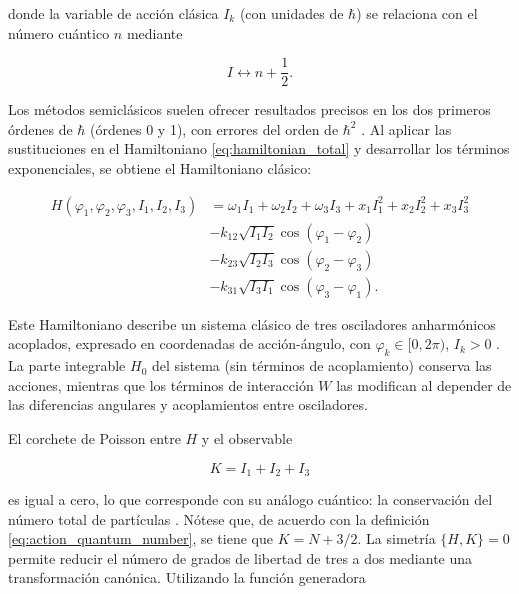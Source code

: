 \noindent donde la variable de acción clásica $ I_k $ (con unidades de $\hbar$) se relaciona con el
número cuántico $n$ mediante

\begin{equation}
    I \leftrightarrow n + \frac{1}{2}.
    \label{eq:action_quantum_number}
\end{equation}

Los métodos semiclásicos suelen ofrecer resultados precisos en los dos primeros órdenes de
$\hbar$ (órdenes 0 y 1), con errores del orden de $\hbar^2$ \cite{mossmann2006semiclassical}.
Al aplicar las sustituciones en el Hamiltoniano \eqref{eq:hamiltonian_total} y desarrollar los
términos exponenciales, se obtiene el Hamiltoniano clásico:

\begin{equation}
    \begin{aligned}
        H(\varphi_1, \varphi_2, \varphi_3, I_1, I_2, I_3) & = \omega_1 I_1 + \omega_2 I_2 + \omega_3 I_3
        + x_1 I_1^2 + x_2 I_2^2 + x_3 I_3^2                                                                      \\
                                                          & - k_{12} \sqrt{I_1 I_2} \cos(\varphi_1 - \varphi_2)  \\
                                                          & - k_{23} \sqrt{I_2 I_3} \cos(\varphi_2 - \varphi_3)  \\
                                                          & - k_{31} \sqrt{I_3 I_1} \cos(\varphi_3 - \varphi_1).
    \end{aligned}
    \label{eq:hamiltonian_classical}
\end{equation}

Este Hamiltoniano describe un sistema clásico de tres osciladores anharmónicos acoplados, expresado
en coordenadas de acción-ángulo, con $\varphi_k \in [0, 2\pi)$, $I_k > 0$ . La parte integrable $H_0$
del sistema (sin términos de acoplamiento) conserva las acciones, mientras que los términos de
interacción $W$ las modifican al depender de las diferencias angulares y acoplamientos entre osciladores.

El corchete de Poisson entre $H$ y el observable

\begin{equation}
    K = I_{1} + I_{2} + I_{3}
    \label{eq:N_constant}
\end{equation}

\noindent es igual a cero, lo que corresponde con su análogo cuántico: la conservación del número total de partículas
\cite{mossmann2006semiclassical}. Nótese que, de acuerdo con la definición \eqref{eq:action_quantum_number},
se tiene que $K = N + 3/2$. La simetría $\{H, K\} = 0$ permite reducir el número de grados de libertad de
tres a dos mediante una transformación canónica. Utilizando la función generadora

